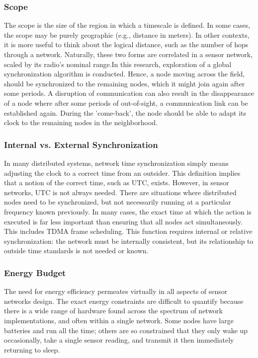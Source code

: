 \documentclass[a4paper,10pt]{report}
\begin{document}
\subsubsection{\textbf{Scope}} The scope is the size of the region in which a timescale is defined. In some cases, the scope may be purely
geographic (e.g., distance in meters). In other contexts, it is more useful to think about the logical distance, such as the number of
hops through a network. Naturally, these two forms are correlated in a sensor network, scaled by its radio's nominal range.\newline In
this research, exploration of a global synchronization algorithm is conducted. Hence, a node moving across the field, should be
synchronized to the remaining nodes, which it might join again after some periods. A disruption of communication can also result in the
disappearance of a node where after some periods of out-of-sight, a communication link can be established again. During the 'come-back',
the node should be able to adapt its clock to the remaining nodes in the neighborhood.
\subsubsection{\textbf{Internal vs. External Synchronization}}
In many distributed systems, network time synchronization simply means adjusting the clock to a correct time from an outsider. This
definition implies that a notion of the correct time, such as UTC, exists. However, in sensor networks, UTC is not always needed. There
are situations where distributed nodes need to be synchronized, but not necessarily running at a particular frequency known previously.
In many cases, the exact time at which the action is executed is far less important than ensuring that all nodes act simultaneously. This
includes TDMA frame scheduling. This function requires internal or relative synchronization: the network must be internally consistent,
but its relationship to outside time standards is not needed or known.
\subsubsection{\textbf{Energy Budget}} The need for energy efficiency permeates virtually in all aspects of sensor networks design. The
exact energy constraints are difficult to quantify because there is a wide range of hardware found across the spectrum of network
implementations, and often within a single network. Some nodes have large batteries and run all the time; others are so constrained that
they only wake up occasionally, take a single sensor reading, and transmit it then immediately returning to sleep.
\end{document}
